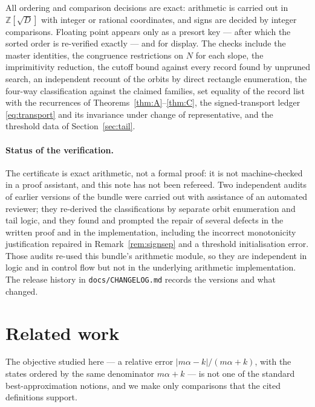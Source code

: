 \documentclass[11pt]{article}
\theoremstyle{definition}
\theoremstyle{remark}
\newcommand{\Z}{\mathbb{Z}}
\begin{document}
All ordering and comparison decisions are exact: arithmetic is carried out in $\Z[\sqrt D]$ with
integer or rational coordinates, and signs are decided by integer comparisons. Floating point
appears only as a presort key --- after which the sorted order is re-verified exactly --- and for
display. The checks include the master identities, the congruence restrictions on $N$ for each
slope, the imprimitivity reduction, the cutoff bound against every record found by unpruned
search, an independent recount of the orbits by direct rectangle enumeration, the four-way
classification against the claimed families, set equality of the record list with the
recurrences of Theorems~\ref{thm:A}--\ref{thm:C}, the signed-transport ledger
\eqref{eq:transport} and its invariance under change of representative, and the threshold data
of Section~\ref{sec:tail}.

\paragraph{Status of the verification.}
The certificate is exact arithmetic, not a formal proof: it is not machine-checked in a proof
assistant, and this note has not been refereed. Two independent audits of earlier versions of
the bundle were carried out with assistance of an automated reviewer; they re-derived the
classifications by separate orbit enumeration and tail logic, and they found and prompted the
repair of several defects in the written proof and in the implementation, including the
incorrect monotonicity justification repaired in Remark~\ref{rem:signsep} and a threshold
initialisation error. Those audits re-used this bundle's arithmetic module, so they are
independent in logic and in control flow but not in the underlying arithmetic implementation.
The release history in \texttt{docs/CHANGELOG.md} records the versions and what changed.

\section{Related work}\label{sec:related}

The objective studied here --- a relative error $|m\alpha-k|/(m\alpha+k)$, with the states
ordered by the same denominator $m\alpha+k$ --- is not one of the standard best-approximation
notions, and we make only comparisons that the cited definitions support.
\end{document}
